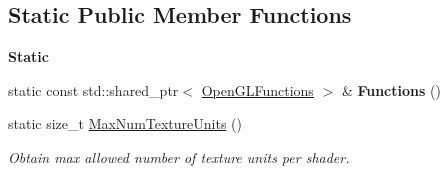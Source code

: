 \subsection*{Static Public Member Functions}
\begin{Indent}\textbf{ Static}\par
\begin{DoxyCompactItemize}
\item 
\mbox{\label{classrev_1_1_g_l_1_1_open_g_l_functions_a7c8052d7a7af7f7deb7d109fcc7695b2}} 
static const std\+::shared\+\_\+ptr$<$ \mbox{\hyperlink{classrev_1_1_g_l_1_1_open_g_l_functions}{Open\+G\+L\+Functions}} $>$ \& {\bfseries Functions} ()
\item 
\mbox{\label{classrev_1_1_g_l_1_1_open_g_l_functions_a1820bd2c5ec7305922d55d1fd3279a1f}} 
static size\+\_\+t \mbox{\hyperlink{classrev_1_1_g_l_1_1_open_g_l_functions_a1820bd2c5ec7305922d55d1fd3279a1f}{Max\+Num\+Texture\+Units}} ()
\begin{DoxyCompactList}\small\item\em Obtain max allowed number of texture units per shader. \end{DoxyCompactList}\end{DoxyCompactItemize}
\end{Indent}
